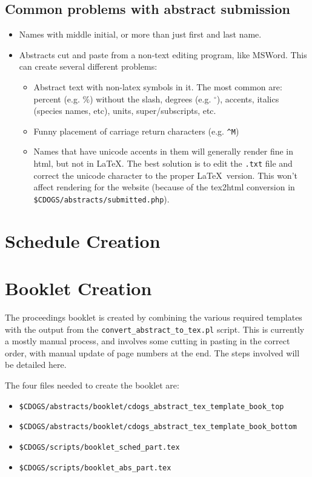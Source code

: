 \documentclass[letterpaper,12pt]{article}
\begin{document}
\subsection{Common problems with abstract submission}

\begin{itemize}
\item Names with middle initial, or more than just first and last
  name.
\item Abstracts cut and paste from a non-text editing program, like
  MSWord. This can create several different problems:
  \begin{itemize}
  \item Abstract text with non-latex symbols in it. The most common
    are: percent (e.g. $\%$) without the slash, degrees
    (e.g. $^{\circ}$), accents, italics (species names, etc), units,
    super/subscripts, etc.
  \item Funny placement of carriage return characters (e.g. \verb|^M|)
  \item Names that have unicode accents in them will generally render
    fine in html, but not in \LaTeX. The best solution is to edit the
    \verb|.txt| file and correct the unicode character to the proper
    \LaTeX\ version. This won't affect rendering for the website
    (because of the tex2html conversion in
    \verb|$CDOGS/abstracts/submitted.php|).
  \end{itemize}

\end{itemize}

\section{Schedule Creation}

\section{Booklet Creation}

The proceedings booklet is created by combining the various required
templates with the output from the \verb|convert_abstract_to_tex.pl|
script. This is currently a mostly manual process, and involves some
cutting in pasting in the correct order, with manual update of page
numbers at the end. The steps involved will be detailed here.

The four files needed to create the booklet are:
\begin{itemize}
\item \verb|$CDOGS/abstracts/booklet/cdogs_abstract_tex_template_book_top|
\item \verb|$CDOGS/abstracts/booklet/cdogs_abstract_tex_template_book_bottom|
\item \verb|$CDOGS/scripts/booklet_sched_part.tex|
\item \verb|$CDOGS/scripts/booklet_abs_part.tex|
\end{itemize}
\end{document}
